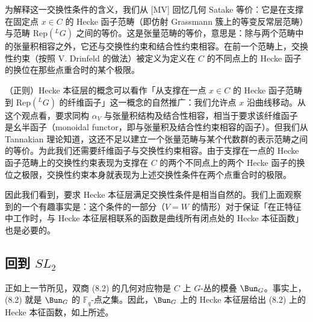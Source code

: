 
为解释这一交换性条件的含义，我们从 [MV] 回忆几何 Satake 等价：它是在支撑在固定点 $x\in C$ 的 Hecke 函子范畴（即仿射 Grassmann 簇上的等变反常层范畴）与范畴 $\mathrm{Rep}({}^{L}G)$ 之间的等价。这是张量范畴的等价，意思是：除与两个范畴中的张量积相容之外，它还与交换性约束和结合性约束相容。在前一个范畴上，交换性约束（按照 V. Drinfeld 的做法）被定义为定义在 $C$ 的不同点上的 Hecke 函子的换位在那些点重合时的某个极限。


（正则）Hecke 本征层的概念可以看作「从支撑在一点 $x\in C$ 的 Hecke 函子范畴到 $\mathrm{Rep}({}^{L}G)$ 的纤维函子」这一概念的自然推广：我们允许点 $x$ 沿曲线移动。从这个观点看，要求同构 $\alpha_V$ 与张量积结构及结合性相容，相当于要求该纤维函子
是幺半函子（monoidal functor，即与张量积及结合性约束相容的函子）。但我们从 Tannakian 理论知道，这还不足以建立一个张量范畴与某个代数群的表示范畴之间的等价。为此我们还需要纤维函子与交换性约束相容。由于支撑在一点的 Hecke 函子范畴上的交换性约束表现为支撑在 $C$ 的两个不同点上的两个 Hecke 函子的换位之极限，交换性约束本身就表现为上述交换性条件在两个点重合时的极限。

因此我们看到，要求 Hecke 本征层满足交换性条件是相当自然的。我们上面观察到的一个有趣事实是：这个条件的一部分（$V = W$ 的情形）对于保证「在正特征中工作时，与 Hecke 本征层相联系的函数是曲线所有闭点处的 Hecke 本征函数」也是必要的。

\subsection{回到 \texorpdfstring{$SL_2$}{SL2}}

正如上一节所见，双商 (8.2) 的几何对应物是 $C$ 上 $G$-丛的模叠 $\Bun_G$。事实上，(8.2) 就是 $\Bun_G$ 的 $\mathbb{F}_q$-点之集。因此，$\Bun_G$ 上的 Hecke 本征层给出 (8.2) 上的 Hecke 本征函数，如上所述。

